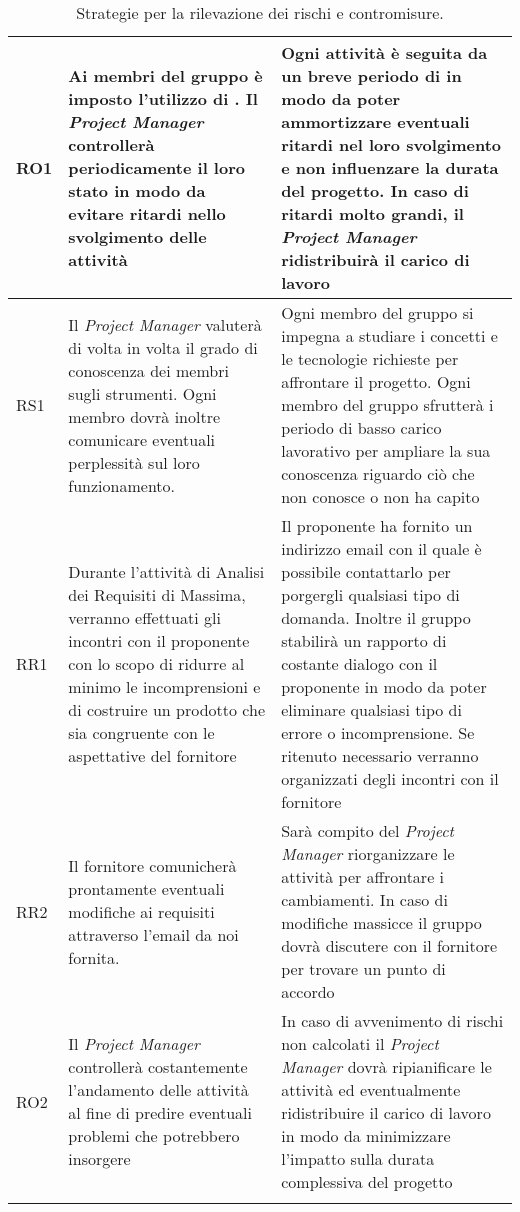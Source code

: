 \begin{longtable}[H]{|l|C{5cm}|C{7cm}|}
		\hline
		RO1     & Ai membri del gruppo è imposto l'utilizzo di . Il \emph{Project Manager} controllerà periodicamente il loro stato in modo da evitare ritardi nello svolgimento delle attività & Ogni attività è seguita da un breve periodo di  in modo da poter ammortizzare eventuali ritardi nel loro svolgimento e non influenzare la durata del progetto. In caso di ritardi molto grandi, il \emph{Project Manager} ridistribuirà il carico di lavoro\\  
		\hline
		RS1     & Il \emph{Project Manager} valuterà di volta in volta il grado di conoscenza dei membri sugli strumenti. Ogni membro dovrà inoltre comunicare eventuali perplessità sul loro funzionamento. & Ogni membro del gruppo si impegna a studiare i concetti e le tecnologie richieste per affrontare il progetto. Ogni membro del gruppo sfrutterà i periodo di basso carico lavorativo per ampliare la sua conoscenza riguardo ciò che non conosce o non ha capito\\
		\hline
		RR1     & Durante l'attività di Analisi dei Requisiti di Massima, verranno effettuati gli incontri con il proponente con lo scopo di ridurre al minimo le incomprensioni e di costruire un prodotto che sia congruente con le aspettative del fornitore  & Il proponente ha fornito un indirizzo email con il quale è possibile contattarlo per porgergli qualsiasi tipo di domanda. Inoltre il gruppo stabilirà un rapporto di costante dialogo con il proponente in modo da poter eliminare qualsiasi tipo di errore o incomprensione. Se ritenuto necessario verranno organizzati degli incontri con il fornitore\\
		\hline
		RR2 & Il fornitore comunicherà prontamente eventuali modifiche ai requisiti attraverso l'email da noi fornita. & Sarà compito del \emph{Project Manager} riorganizzare le attività per affrontare i cambiamenti. In caso di modifiche massicce il gruppo dovrà discutere con il fornitore per trovare un punto di accordo\\
		\hline                                                                                                                           
		RO2 & Il \emph{Project Manager} controllerà costantemente l'andamento delle attività al fine di predire eventuali problemi che potrebbero insorgere & In caso di avvenimento di rischi non calcolati il \emph{Project Manager} dovrà ripianificare le attività ed eventualmente ridistribuire il carico di lavoro in modo da minimizzare l'impatto sulla durata complessiva del progetto\\
		\hline
		\caption{Strategie per la rilevazione dei rischi e contromisure.}
\end{longtable}





